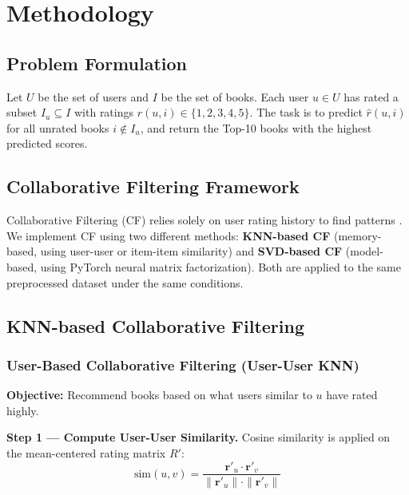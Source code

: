\documentclass[12pt, a4paper]{article}
\begin{document}
\newpage
\section{Methodology}
\label{sec:methodology}

\subsection{Problem Formulation}

Let $U$ be the set of users and $I$ be the set of books.
Each user $u \in U$ has rated a subset $I_u \subseteq I$ with ratings $r(u, i) \in \{1,2,3,4,5\}$.
The task is to predict $\hat{r}(u, i)$ for all unrated books $i \notin I_u$,
and return the Top-10 books with the highest predicted scores.

\subsection{Collaborative Filtering Framework}

Collaborative Filtering (CF) relies solely on user rating history to find patterns \cite{su2009}.
We implement CF using two different methods:
\textbf{KNN-based CF} (memory-based, using user-user or item-item similarity) and
\textbf{SVD-based CF} (model-based, using PyTorch neural matrix factorization).
Both are applied to the same preprocessed dataset under the same conditions.

\subsection{KNN-based Collaborative Filtering}

\subsubsection{User-Based Collaborative Filtering (User-User KNN)}

\textbf{Objective:} Recommend books based on what users similar to $u$ have rated highly.

\textbf{Step 1 --- Compute User-User Similarity.}
Cosine similarity is applied on the mean-centered rating matrix $R'$:
\[
  \text{sim}(u, v) = \frac{\mathbf{r'}_u \cdot \mathbf{r'}_v}{\|\mathbf{r'}_u\| \cdot \|\mathbf{r'}_v\|}
\]
\end{document}
